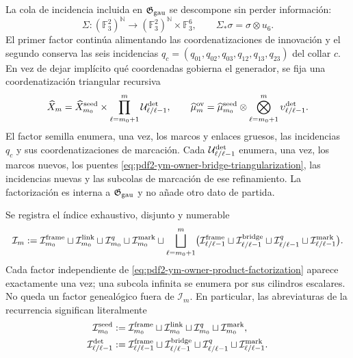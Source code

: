 La cola de incidencia incluida en $\mathfrak G_{\rm gau}$ se descompone sin perder
información:
\begin{equation}\label{eq:pdf2-ym-owner-seed-split}
 \Sigma:(\mathbb F_3^2)^{\mathbb N}\longrightarrow
 (\mathbb F_3^2)^{\mathbb N}\times\mathbb F_3^6,
 \qquad \Sigma_*\sigma=\sigma\otimes u_6.
\end{equation}
El primer factor continúa alimentando las coordenatizaciones de innovación y el segundo conserva
las seis incidencias $q_c=(q_{01},q_{02},q_{03},q_{12},q_{13},q_{23})$ del collar
$c$. En vez de dejar implícito qué coordenadas gobierna el generador, se fija una
coordenatización triangular recursiva
\begin{equation}\label{eq:pdf2-ym-owner-product-factorization}
 \widehat X_m
 =\widehat X_{m_0}^{\rm seed}
  \times\prod_{\ell=m_0+1}^{m}
       \mathcal U_{\ell/\ell-1}^{\rm det},
 \qquad
 \widehat\mu_m^{\rm ov}
 =\widehat\mu_{m_0}^{\rm seed}
  \otimes\bigotimes_{\ell=m_0+1}^{m}
       \upsilon_{\ell/\ell-1}^{\rm det}.
\end{equation}
El factor semilla enumera, una vez, los marcos y enlaces gruesos, las incidencias
$q_c$ y sus coordenatizaciones de marcación. Cada
$\mathcal U_{\ell/\ell-1}^{\rm det}$ enumera, una vez, los marcos nuevos, los puentes
\eqref{eq:pdf2-ym-owner-bridge-triangularization}, las incidencias nuevas y las
subcolas de marcación de ese refinamiento. La factorización es interna a
$\mathfrak G_{\rm gau}$ y no añade otro dato de partida.

Se registra el índice exhaustivo, disjunto y numerable
\begin{equation}\label{eq:pdf2-ym-owner-exhaustive-index}
 \mathcal I_m
 :=\mathcal I_{m_0}^{\rm frame}
 \sqcup\mathcal I_{m_0}^{\rm link}
 \sqcup\mathcal I_{m_0}^{q}
 \sqcup\mathcal I_{m_0}^{\rm mark}
 \sqcup\bigsqcup_{\ell=m_0+1}^{m}
 \bigl(
   \mathcal I_{\ell/\ell-1}^{\rm frame}
   \sqcup\mathcal I_{\ell/\ell-1}^{\rm bridge}
   \sqcup\mathcal I_{\ell/\ell-1}^{q}
   \sqcup\mathcal I_{\ell/\ell-1}^{\rm mark}
 \bigr).
\end{equation}
Cada factor independiente de \eqref{eq:pdf2-ym-owner-product-factorization} aparece
exactamente una vez; una subcola infinita se enumera por sus cilindros escalares. No
queda un factor genealógico fuera de $\mathcal I_m$.
En particular, las abreviaturas de la recurrencia significan literalmente
\begin{equation}\label{eq:pdf2-ym-owner-index-abbreviations}
 \begin{aligned}
 \mathcal I_{m_0}^{\rm seed}
 &:={\mathcal I}_{m_0}^{\rm frame}\sqcup
    {\mathcal I}_{m_0}^{\rm link}\sqcup
    {\mathcal I}_{m_0}^{q}\sqcup
    {\mathcal I}_{m_0}^{\rm mark},\\
 \mathcal I_{\ell/\ell-1}^{\rm det}
 &:={\mathcal I}_{\ell/\ell-1}^{\rm frame}\sqcup
    {\mathcal I}_{\ell/\ell-1}^{\rm bridge}\sqcup
    {\mathcal I}_{\ell/\ell-1}^{q}\sqcup
    {\mathcal I}_{\ell/\ell-1}^{\rm mark}.
 \end{aligned}
\end{equation}

